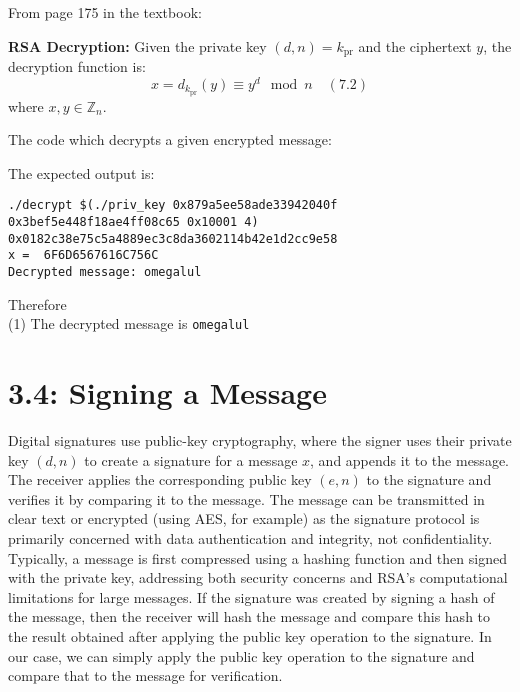 \documentclass[a4paper,11pt]{article}
\theoremstyle{mytheor}
\begin{document}
\noindent From page 175 in the textbook:
\begin{tcolorbox}[colback=white,colframe=black,sharp corners, boxrule=0.5pt]
\textbf{RSA Decryption:} Given the private key \((d, n) = k_{\text{pr}}\) and the ciphertext \(y\), the decryption function is:
\[ x = d_{k_{\text{pr}}}(y) \equiv y^d \mod n \quad (7.2) \]
where \(x, y \in \mathbb{Z}_n\).
\end{tcolorbox}

\vspace{4mm}
\noindent The code which decrypts a given encrypted message:
\vspace{4mm} %


\vspace{4mm}
\noindent The expected output is:

\begin{verbatim}
./decrypt $(./priv_key 0x879a5ee58ade33942040f
0x3bef5e448f18ae4ff08c65 0x10001 4)
0x0182c38e75c5a4889ec3c8da3602114b42e1d2cc9e58 
x =  6F6D6567616C756C
Decrypted message: omegalul
\end{verbatim}

\noindent Therefore \\
(1) The decrypted message is \texttt{omegalul}

\vspace{-2mm}
\section*{\large 3.4: Signing a Message}

\noindent Digital signatures use public-key cryptography, where the signer uses their private key \((d, n)\) to create a signature for a message \(x\), and appends it to the message. The receiver applies the corresponding public key \((e, n)\) to the signature and verifies it by comparing it to the message. The message can be transmitted in clear text or encrypted (using AES, for example) as the signature protocol is primarily concerned with data authentication and integrity, not confidentiality. \\

\noindent Typically, a message is first compressed using a hashing function and then signed with the private key, addressing both security concerns and RSA's computational limitations for large messages. If the signature was created by signing a hash of the message, then the receiver will hash the message and compare this hash to the result obtained after applying the public key operation to the signature. In our case, we can simply apply the public key operation to the signature and compare that to the message for verification.
\end{document}
